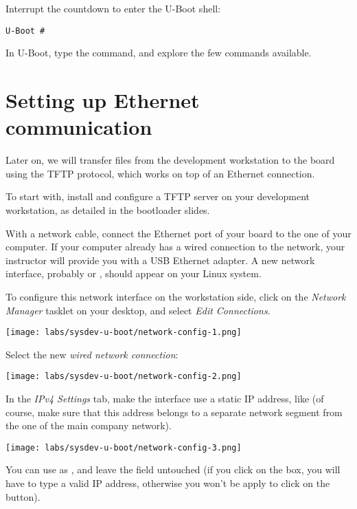 Interrupt the countdown to enter the U-Boot shell:
\begin{verbatim}
U-Boot #
\end{verbatim}

In U-Boot, type the  command, and explore the few commands available.

\section{Setting up Ethernet communication}

Later on, we will transfer files from the development workstation to
the board using the TFTP protocol, which works on top of an Ethernet
connection.

To start with, install and configure a TFTP server on your development
workstation, as detailed in the bootloader slides.

With a network cable, connect the Ethernet port of your board to the
one of your computer. If your computer already has a wired connection
to the network, your instructor will provide you with a USB Ethernet
adapter. A new network interface, probably  or ,
should appear on your Linux system.

To configure this network interface on the workstation side, click on
the {\em Network Manager} tasklet on your desktop, and select {\em
  Edit Connections}.

\begin{center}
\texttt{[image: labs/sysdev-u-boot/network-config-1.png]}
\end{center}

Select the new {\em wired network connection}:

\begin{center}
\texttt{[image: labs/sysdev-u-boot/network-config-2.png]}
\end{center}

In the {\em IPv4 Settings} tab, make the interface use a static IP
address, like  (of course, make sure that this
address belongs to a separate network segment from the one of the main
company network).

\begin{center}
\texttt{[image: labs/sysdev-u-boot/network-config-3.png]}
\end{center}

You can use  as , and leave the
 field untouched (if you click on the  box, you
will have to type a valid IP address, otherwise you won't be apply to
click on the  button).

